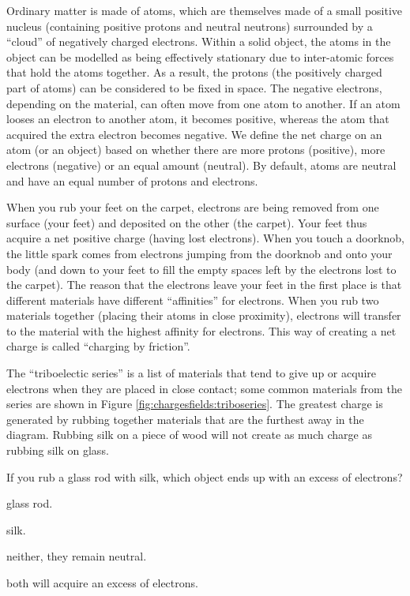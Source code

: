 Ordinary matter is made of atoms, which are themselves made of a small positive nucleus (containing positive protons and neutral neutrons) surrounded by a ``cloud'' of negatively charged electrons. Within a solid object, the atoms in the object can be modelled as being effectively stationary due to inter-atomic forces that hold the atoms together. As a result, the protons (the positively charged part of atoms) can be considered to be fixed in space. The negative electrons, depending on the material, can often move from one atom to another. If an atom looses an electron to another atom, it becomes positive, whereas the atom that acquired the extra electron becomes negative. We define the net charge on an atom (or an object) based on whether there are more protons (positive), more electrons (negative) or an equal amount (neutral). By default, atoms are neutral and have an equal number of protons and electrons.

When you rub your feet on the carpet, electrons are being removed from one surface (your feet) and deposited on the other (the carpet). Your feet thus acquire a net positive charge (having lost electrons). When you touch a doorknob, the little spark comes from electrons jumping from the doorknob and onto your body (and down to your feet to fill the empty spaces left by the electrons lost to the carpet). The reason that the electrons leave your feet in the first place is that different materials have different ``affinities'' for electrons. When you rub two materials together (placing their atoms in close proximity), electrons will transfer to the material with the highest affinity for electrons. This way of creating a net charge is called ``charging by friction''.

The ``triboelectic series'' is a list of materials that tend to give up or acquire electrons when they are placed in close contact; some common materials from the series are shown in Figure \ref{fig:chargesfields:triboseries}.  The greatest charge is generated by rubbing together materials that are the furthest away in the diagram. Rubbing silk on a piece of wood will not create as much charge as rubbing silk on glass.


\begin{checkpoint}\label{cp:chargesfields:tribo}
\begin{MCquestion}{If you rub a glass rod with silk, which object ends up with an excess of electrons?}
\item glass rod.
\item silk. \correct
\item neither, they remain neutral.
\item both will acquire an excess of electrons.
\end{MCquestion}
\end{checkpoint}

